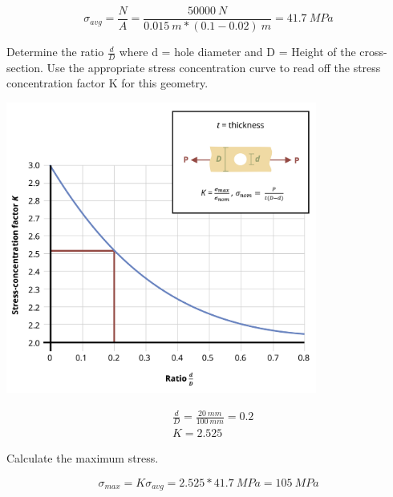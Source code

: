 \documentclass[
  letterpaper,
  DIV=11,
  numbers=noendperiod]{scrreprt}
\theoremstyle{definition}
\theoremstyle{remark}
\begin{document}
\begin{tcolorbox}
\begin{tcolorbox}
\[
\sigma_{a v g}=\frac{N}{A}=\frac{50000{~N}}{0.015{~m} *(0.1-0.02){~m}}=41.7{~MPa}
\]

Determine the ratio \(\frac{d}{D}\) where d = hole diameter and D =
Height of the cross-section. Use the appropriate stress concentration
curve to read off the stress concentration factor K for this geometry.

\begin{center}
\includegraphics[width=4.02083in,height=\textheight]{images/PNGs/Example 5.1 part 3.png}
\end{center}

\[
\begin{aligned}
&\frac{d}{D}=\frac{20{~mm}}{100{~mm}}=0.2\\
&K=2.525
\end{aligned}
\]

Calculate the maximum stress.

\[
\sigma_{max }=K \sigma_{avg}=2.525*41.7{~MPa}=105{~MPa}
\]

\end{tcolorbox}

\end{tcolorbox}
\end{document}
